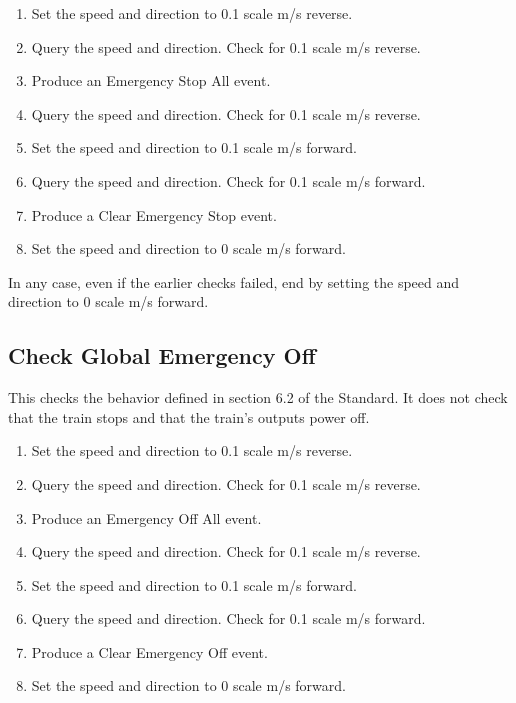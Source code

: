 \begin{enumerate}

    \item Set the speed and direction to 0.1 scale m/s reverse.

    \item Query the speed and direction. Check for 0.1 scale m/s reverse.

    \item Produce an Emergency Stop All event.

    \item Query the speed and direction. Check for 0.1 scale m/s reverse.

    \item Set the speed and direction to 0.1 scale m/s forward.

    \item Query the speed and direction. Check for 0.1 scale m/s forward.

    \item Produce a Clear Emergency Stop event.
    
    \item Set the speed and direction to 0 scale m/s forward.

\end{enumerate}

In any case, even if the earlier checks failed, end by setting the speed 
and direction to 0 scale m/s forward.

\subsection{Check Global Emergency Off}

This checks the behavior defined in section 6.2 of the Standard.
It does not check that the train stops and that the train's outputs power off.

\begin{enumerate}

    \item Set the speed and direction to 0.1 scale m/s reverse.

    \item Query the speed and direction. Check for 0.1 scale m/s reverse.

    \item Produce an Emergency Off All event.

    \item Query the speed and direction. Check for 0.1 scale m/s reverse.

    \item Set the speed and direction to 0.1 scale m/s forward.

    \item Query the speed and direction. Check for 0.1 scale m/s forward.

    \item Produce a Clear Emergency Off event.
    
    \item Set the speed and direction to 0 scale m/s forward.

\end{enumerate}

